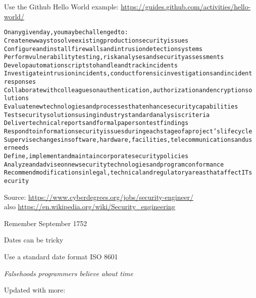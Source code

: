 \documentclass[Screen16to9,17pt]{foils}
\begin{document}
Use the Github Hello World example: \url{https://guides.github.com/activities/hello-world/}



\begin{alltt}\footnotesize
On any given day, you may be challenged to:
        Create new ways to solve existing production security issues
        Configure and install firewalls and intrusion detection systems
        Perform vulnerability testing, risk analyses and security assessments
        Develop automation scripts to handle and track incidents
        Investigate intrusion incidents, conduct forensic investigations and incident responses
        Collaborate with colleagues on authentication, authorization and encryption solutions
        Evaluate new technologies and processes that enhance security capabilities
        Test security solutions using industry standard analysis criteria
        Deliver technical reports and formal papers on test findings
        Respond to information security issues during each stage of a project’s lifecycle
        Supervise changes in software, hardware, facilities, telecommunications and user needs
        Define, implement and maintain corporate security policies
        Analyze and advise on new security technologies and program conformance
        Recommend modifications in legal, technical and regulatory areas that affect IT security
\end{alltt}

Source: \url{https://www.cyberdegrees.org/jobs/security-engineer/}\\
also
\url{https://en.wikipedia.org/wiki/Security_engineering}










\begin{quote}

\end{quote}

\begin{list2}
\item Remember September 1752
\item Dates can be tricky
\item Use a standard date format ISO 8601
\item \emph{Falsehoods programmers believe about time}\\
\item Updated with more:\\
\end{list2}
\end{document}
